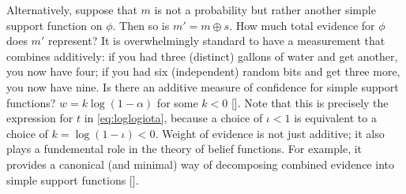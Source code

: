 \begin{example}
Alternatively, suppose that $m$ is not a probability but rather
another simple support function on $\phi$. 
Then so is $m' = m\oplus s$. 
How much total evidence for $\phi$ does $m'$ represent?
It is overwhelmingly standard to have a measurement that combines additively:
if you had three (distinct) gallons of water and get another, you now have four;
if you had six (independent) random bits and get three more, you now have nine. 
Is there an additive measure of confidence 
for simple support functions? 
$w = k \log (1-\alpha)$ for some $k < 0$
[\citeauthor[pg 78]{shafer1976mathematical}]. 
Note that this is precisely the expression for $t$
in \eqref{eq:loglogiota}, 
because a choice of $\iota < 1$
is equivalent to a choice of $k = \log(1-\iota) < 0$.
Weight of evidence is
not just additive;
it also plays a fundemental role in the theory of belief
functions.
For example, it provides a
canonical (and minimal) way of decomposing
combined evidence into simple support functions
[\citeauthor[Theorem 5.5]{shafer1976mathematical}].
\end{example}

